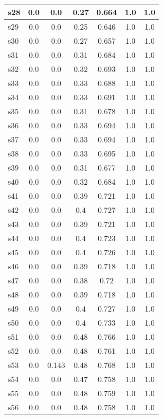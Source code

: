 \documentclass{article}
\begin{document}
\begin{tabular}{|l|c|c|c|c|c|c|}
\hline
s28 &0.0 & 0.0 & 0.27 & 0.664 & 1.0 & 1.0\\
\hline
s29 &0.0 & 0.0 & 0.25 & 0.646 & 1.0 & 1.0\\
\hline
s30 &0.0 & 0.0 & 0.27 & 0.657 & 1.0 & 1.0\\
\hline
s31 &0.0 & 0.0 & 0.31 & 0.684 & 1.0 & 1.0\\
\hline
s32 &0.0 & 0.0 & 0.32 & 0.693 & 1.0 & 1.0\\
\hline
s33 &0.0 & 0.0 & 0.33 & 0.688 & 1.0 & 1.0\\
\hline
s34 &0.0 & 0.0 & 0.33 & 0.691 & 1.0 & 1.0\\
\hline
s35 &0.0 & 0.0 & 0.31 & 0.678 & 1.0 & 1.0\\
\hline
s36 &0.0 & 0.0 & 0.33 & 0.694 & 1.0 & 1.0\\
\hline
s37 &0.0 & 0.0 & 0.33 & 0.694 & 1.0 & 1.0\\
\hline
s38 &0.0 & 0.0 & 0.33 & 0.695 & 1.0 & 1.0\\
\hline
s39 &0.0 & 0.0 & 0.31 & 0.677 & 1.0 & 1.0\\
\hline
s40 &0.0 & 0.0 & 0.32 & 0.684 & 1.0 & 1.0\\
\hline
s41 &0.0 & 0.0 & 0.39 & 0.721 & 1.0 & 1.0\\
\hline
s42 &0.0 & 0.0 & 0.4 & 0.727 & 1.0 & 1.0\\
\hline
s43 &0.0 & 0.0 & 0.39 & 0.721 & 1.0 & 1.0\\
\hline
s44 &0.0 & 0.0 & 0.4 & 0.723 & 1.0 & 1.0\\
\hline
s45 &0.0 & 0.0 & 0.4 & 0.726 & 1.0 & 1.0\\
\hline
s46 &0.0 & 0.0 & 0.39 & 0.718 & 1.0 & 1.0\\
\hline
s47 &0.0 & 0.0 & 0.38 & 0.72 & 1.0 & 1.0\\
\hline
s48 &0.0 & 0.0 & 0.39 & 0.718 & 1.0 & 1.0\\
\hline
s49 &0.0 & 0.0 & 0.4 & 0.727 & 1.0 & 1.0\\
\hline
s50 &0.0 & 0.0 & 0.4 & 0.733 & 1.0 & 1.0\\
\hline
s51 &0.0 & 0.0 & 0.48 & 0.766 & 1.0 & 1.0\\
\hline
s52 &0.0 & 0.0 & 0.48 & 0.761 & 1.0 & 1.0\\
\hline
s53 &0.0 & 0.143 & 0.48 & 0.768 & 1.0 & 1.0\\
\hline
s54 &0.0 & 0.0 & 0.47 & 0.758 & 1.0 & 1.0\\
\hline
s55 &0.0 & 0.0 & 0.48 & 0.759 & 1.0 & 1.0\\
\hline
s56 &0.0 & 0.0 & 0.48 & 0.758 & 1.0 & 1.0\\

\end{tabular}
\end{document}
